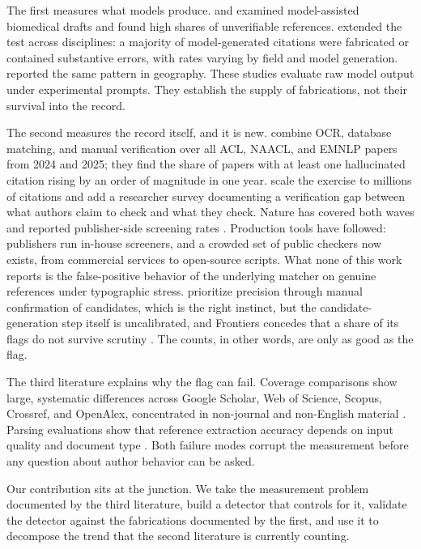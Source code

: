 \documentclass[11pt, a4paper]{article}
\begin{document}
The first measures what models produce. \citet{bhattacharyya2023} and \citet{eysenbach2023} examined model-assisted biomedical drafts and found high shares of unverifiable references. \citet{walters2023} extended the test across disciplines: a majority of model-generated citations were fabricated or contained substantive errors, with rates varying by field and model generation. \citet{day2023} reported the same pattern in geography. These studies evaluate raw model output under experimental prompts. They establish the supply of fabrications, not their survival into the record.

The second measures the record itself, and it is new. \citet{sakai2026} combine OCR, database matching, and manual verification over all ACL, NAACL, and EMNLP papers from 2024 and 2025; they find the share of papers with at least one hallucinated citation rising by an order of magnitude in one year. \citet{ghostcite2026} scale the exercise to millions of citations and add a researcher survey documenting a verification gap between what authors claim to check and what they check. Nature has covered both waves and reported publisher-side screening rates \citep{naddaf2026, stokelwalker2026}. Production tools have followed: publishers run in-house screeners, and a crowded set of public checkers now exists, from commercial services to open-source scripts. What none of this work reports is the false-positive behavior of the underlying matcher on genuine references under typographic stress. \citet{sakai2026} prioritize precision through manual confirmation of candidates, which is the right instinct, but the candidate-generation step itself is uncalibrated, and Frontiers concedes that a share of its flags do not survive scrutiny \citep{naddaf2026}. The counts, in other words, are only as good as the flag.

The third literature explains why the flag can fail. Coverage comparisons show large, systematic differences across Google Scholar, Web of Science, Scopus, Crossref, and OpenAlex, concentrated in non-journal and non-English material \citep{martinmartin2018, visser2021, verabaceta2019}. Parsing evaluations show that reference extraction accuracy depends on input quality and document type \citep{lopez2009, tkaczyk2018}. Both failure modes corrupt the measurement before any question about author behavior can be asked.

Our contribution sits at the junction. We take the measurement problem documented by the third literature, build a detector that controls for it, validate the detector against the fabrications documented by the first, and use it to decompose the trend that the second literature is currently counting.
\end{document}
